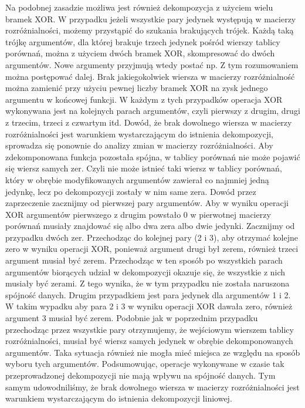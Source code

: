 Na podobnej zasadzie możliwa jest również dekompozycja z użyciem wielu bramek XOR.
W przypadku jeżeli wszystkie pary jedynek występują w macierzy rozróżnialności, możemy przystąpić do szukania brakujących trójek.
Każdą taką trójkę argumentów, dla której brakuje trzech jedynek pośród wierszy tablicy porównań, można z użyciem dwóch bramek XOR, skompresować do dwóch argumentów.
Nowe argumenty przyjmują wtedy postać np.
 Z tym rozumowaniem można postępować dalej.
Brak jakiegokolwiek wiersza w macierzy rozróżnialność można zamienić przy użyciu pewnej liczby bramek XOR na zysk jednego argumentu w końcowej funkcji.
W każdym z tych przypadków operacja XOR wykonywana jest na kolejnych parach argumentów, czyli pierwszy z drugim, drugi z trzecim, trzeci z czwartym itd.
Dowód, że brak dowolnego wiersza w macierzy rozróżnialności jest warunkiem wystarczającym do istnienia dekompozycji, sprowadza się ponownie do analizy zmian w macierzy rozróżnialności.
Aby zdekomponowana funkcja pozostała spójna, w tablicy porównań nie może pojawić się wiersz samych zer.
Czyli nie może istnieć taki wiersz w tablicy porównań, który w obrębie modyfikowanych argumentów zawierał co najmniej jedną jedynkę, lecz po dekompozycji zostały w nim same zera.
Dowód przez zaprzeczenie zacznijmy od pierwszej pary argumentów.
Aby w wyniku operacji XOR argumentów pierwszego z drugim powstało 0 w pierwotnej macierzy porównań musiały znajdować się albo dwa zera albo dwie jedynki.
Zacznijmy od przypadku dwóch zer.
Przechodząc do kolejnej pary (2 i 3), aby otrzymać kolejne zero w wyniku operacji XOR, ponieważ argument drugi był zerem, również trzeci argument musiał być zerem.
Przechodząc w ten sposób po wszystkich parach argumentów biorących udział w dekompozycji okazuje się, że wszystkie z nich musiały być zerami.
Z tego wynika, że w tym przypadku nie została naruszona spójność danych.
Drugim przypadkiem jest para jedynek dla argumentów 1 i 2.
W takim wypadku aby para 2 i 3 w wyniku operacji XOR dawała zero, również argument 3 musiał być zerem.
Podobnie jak w poprzednim przypadku przechodząc przez wszystkie pary otrzymujemy, że wejściowym wierszem tablicy rozróżnialności, musiał być wiersz samych jedynek w obrębie dekomponowanych argumentów.
Taka sytuacja również nie mogła mieć miejsca ze względu na sposób wyboru tych argumentów.
Podsumowując, operacje wykonywane w czasie tak przeprowadzonej dekompozycji nie mają wpływu na spójność danych.
Tym samym udowodniliśmy, że brak dowolnego wiersza w macierzy rozróżnialności jest warunkiem wystarczającym do istnienia dekompozycji liniowej.


